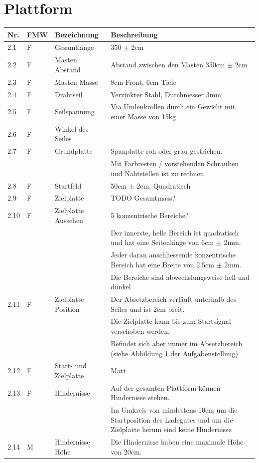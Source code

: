 \documentclass[a4paper]{report}
\begin{document}
\section{Plattform}
\label{app:sec:Plattform}
\begin{tabular}{|p{}|p{}|p{}|p{}|}
	\hline
	\textbf{Nr.} & \textbf{FMW\footnotemark} & \textbf{Bezeichnung} & \textbf{Beschreibung} \\
	\hline
	2.1 & F & Gesamtlänge & 350 $\pm$ 2cm \\
	\hline
	2.2 & F & Masten Abstand & Abstand zwischen den Masten 350cm $\pm$ 2cm \\
	\hline
	2.3 & F & Masten Masse & 8cm Front, 6cm Tiefe \\
	\hline
	2.4 & F & Drahtseil & Verzinkter Stahl, Durchmesser 3mm \\
	\hline
	2.5 & F & Seilspannung & Via Umlenkrollen durch ein Gewicht mit einer Masse von 15kg \\
	\hline
	2.6 & F & Winkel des Seiles & \\
	\hline
	2.7 & F & Grundplatte & Spanplatte roh oder grau gestrichen.\\
	& & & Mit Farbresten / vorstehenden Schrauben und Nahtstellen ist zu rechnen \\
	\hline
	2.8 & F & Startfeld & 50cm $\pm$ 2cm, Quadratisch \\
	\hline
	2.9 & F & Zielplatte & TODO Gesamtmass? \\
	\hline
	2.10 & F & Zielplatte Aussehen & 5 konzentrische Bereiche?\\
	& & & Der innerste, helle Bereich ist quadratisch und hat eine Seitenlänge von 6cm $\pm$ 2mm. \\
	& & & Jeder daran anschliessende konzentrische Bereich hat eine Breite von 2.5cm $\pm$ 2mm. \\
	& & & Die Bereiche sind abwechslungsweise hell und dunkel \\
	\hline
	2.11 & F & Zielplatte Position & Der Absetzbereich verläuft unterhalb des Seiles und ist 2cm breit.\\
	& & & Die Zielplatte kann bis zum Startsignal verschoben werden.\\
	& & & Befindet sich aber immer im Absetzbereich (siehe Abbildung 1 der Aufgabenstellung) \\
	\hline
	2.12 & F & Start- und Zielplatte & Matt \\
	\hline
	2.13 & F & Hindernisse & Auf der gesamten Plattform können Hindernisse stehen.\\
	& & & Im Umkreis von mindestens 10cm um die Startposition des Ladegutes und um die Zielplatte herum sind keine Hindernisse \\
	\hline
	2.14 & M & Hindernisse Höhe & Die Hindernisse haben eine maximale Höhe von 20cm. \\
	\hline
\end{tabular}
\end{document}
